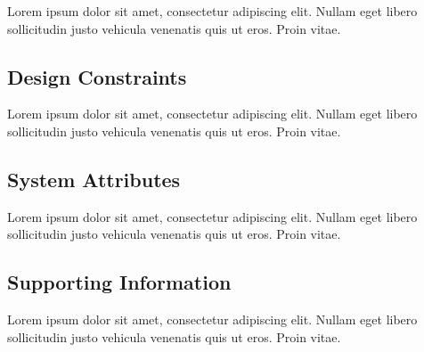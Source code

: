 \documentclass[a4paper]{article}
\begin{document}
        Lorem ipsum dolor sit amet, consectetur adipiscing elit. Nullam eget libero sollicitudin justo vehicula venenatis quis ut eros. Proin vitae.

        \subsection{Design Constraints}

        Lorem ipsum dolor sit amet, consectetur adipiscing elit. Nullam eget libero sollicitudin justo vehicula venenatis quis ut eros. Proin vitae.

        \subsection{System Attributes}

        Lorem ipsum dolor sit amet, consectetur adipiscing elit. Nullam eget libero sollicitudin justo vehicula venenatis quis ut eros. Proin vitae.

        \subsection{Supporting Information}

        Lorem ipsum dolor sit amet, consectetur adipiscing elit. Nullam eget libero sollicitudin justo vehicula venenatis quis ut eros. Proin vitae.
\end{document}
